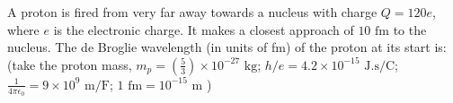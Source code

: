 
\item A proton is fired from very far away towards a nucleus with charge \( Q = 120 e \), where \( e \) is the electronic charge. It makes a closest approach of \(10 \text{ fm} \) to the nucleus. The de Broglie wavelength (in units of fm) of the proton at its start is: (take the proton mass, \( m_p = \left(\frac{5}{3}\right) \times 10^{-27} \text{ kg} \); \( h/e = 4.2 \times 10^{-15} \text{ J.s/C} \); \( \frac{1}{4\pi\epsilon_0} = 9 \times 10^{9} \text{ m/F} \); \(1 \text{ fm} = 10^{-15} \text{ m}\) )
